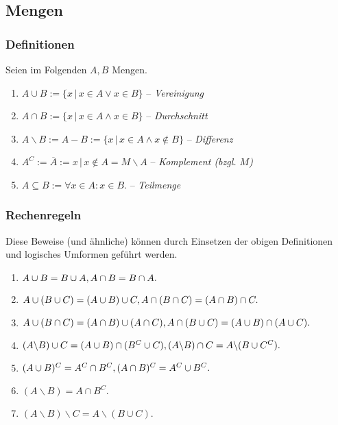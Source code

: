 \documentclass[a4paper, 9pt, DIV=24]{scrartcl}
\begin{document}
\subsection{Mengen}
\subsubsection{Definitionen}
Seien im Folgenden $A, B$ Mengen.
\begin{enumerate}[label={(}\arabic*{)}]
 \item $A \cup B := \{x\, |\, x \in A \lor x \in B\}$ -- \emph{Vereinigung}
 \item $A \cap B := \{x\, |\, x \in A \land x \in B\}$ -- \emph{Durchschnitt}
 \item $A \backslash B := A - B := \{x\, |\, x \in A \wedge x \notin B\}$ -- \emph{Differenz}
 \item $A^C := \overline{A} := {x\, |\, x \notin A} = M \backslash A$ -- \emph{Komplement (bzgl. $M$)}
 \item $A \subseteq B := \forall x \in A: x \in B.$ -- \emph{Teilmenge}
\end{enumerate}
\subsubsection{Rechenregeln}
Diese Beweise (und ähnliche) können durch Einsetzen der obigen Definitionen und logisches Umformen geführt werden.
\begin{enumerate}[label={(}\arabic*{)}]
 \item $A \cup B = B \cup A, \\ A \cap B = B \cap A.$
 \item $A \cup (B \cup C) = (A \cup B) \cup C, \\ A \cap (B \cap C) = (A \cap B) \cap C.$
 \item $A \cup (B \cap C) = (A \cap B) \cup (A \cap C), \\ A \cap (B \cup C) = (A \cup B) \cap (A \cup C).$
 \item $(A\backslash B) \cup C = (A \cup B) \cap (B^C \cup C), \\ (A\backslash B) \cap C = A \backslash (B \cup C^C).$
 \item $(A \cup B)^C = A^C \cap B^C, \\ (A \cap B)^C = A^C \cup B^C.$
 \item $(A\backslash B) = A \cap B^C.$
 \item $(A\backslash B) \backslash C = A \backslash (B \cup C).$
\end{enumerate}
\end{document}

